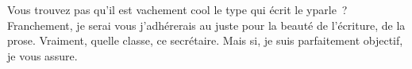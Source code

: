 
Vous trouvez pas qu'il est vachement cool le type qui écrit le \cof{}yparle~? Franchement, je serai vous j'adhérerais au
\cof{} juste pour la beauté de l'écriture, de la prose. Vraiment, quelle classe, ce secrétaire.
Mais si, je suis parfaitement objectif, je vous assure.  

\Pandada
